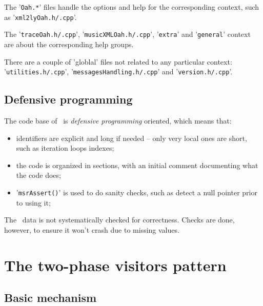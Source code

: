 \documentclass[12pt,a4paper]{article}
\begin{document}
The '{\tt *Oah.*}' files handle the options and help for the corresponding context, such as '{\tt xml2lyOah.h/.cpp}'.

The '{\tt traceOah.h/.cpp}', '{\tt musicXMLOah.h/.cpp}', '{\tt extra}' and '{\tt general}' context are about the corresponding help groups.

There are a couple of 'globlal' files not related to any particular context: '{\tt utilities.h/.cpp}', '{\tt messagesHandling.h/.cpp}' and '{\tt version.h/.cpp}'.


\subsection{Defensive programming}

The code base of \xmlToLy\ is {\it defensive programming} oriented, which means that:
\begin{itemize}
\item identifiers are explicit and long if needed -- only very local ones are short, such as iteration loops indexes;

\item the code is organized in sections, with an initial comment documenting what the code does;

\item '{\tt msrAssert()}' is used to do sanity checks, such as detect a null pointer prior to using it;
\end{itemize}

The \mxml\ data is not systematically checked for correctness. Checks are done, however, to ensure it won't crash due to missing values.


\section{The two-phase visitors pattern}

\subsection{Basic mechanism}
\end{document}
